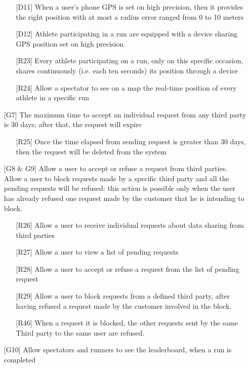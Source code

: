 \begin{itemize}
\begin{itemize}
	\item[{[D11]}] When a user's phone GPS is set on high precision, then it provides the right position with at most a radius error ranged from 0 to 10 meters
	\item[{[D12]}] Athlete participating in a run are equipped with a device sharing GPS position set on high precision
	\item[{[R23]}] Every athlete participating on a run, only on this specific occasion, shares continuously (i.e. each ten seconds) its position through a device
	\item[{[R24]}] Allow a spectator to see on a map the real-time position of every athlete in a specific run
	\end{itemize}
\item[{[G7]}] The maximum time to accept an individual request from any third party is 30 days; after that, the request will expire
	\begin{itemize}
	\item[{[R25]}] Once the time elapsed from sending request is greater than 30 days, then the request will be deleted from the system
	\end{itemize}
\item[{[G8 \& G9]}] Allow a user to accept or refuse a request from third parties. Allow a user to block requests made by a specific third party and all the pending requests will be refused: this action is possible only when the user has already refused one request made
by the customer that he is intending to block. 
	\begin{itemize}
	\item[{[R26]}] Allow a user to receive individual requests about data sharing from third parties
	\item[{[R27]}] Allow a user to view a list of pending requests
	\item[{[R28]}] Allow a user to accept or refuse a request from the list of pending request
	\item[{[R29]}] Allow a user to block requests from a defined third party, after having refused a request made by the customer
	involved in the block.
	\item[{[R46]}] When a request it is blocked, the other requests sent by the same Third party to the same user are refused.
	\end{itemize}	
\item[{[G10]}] Allow spectators and runners to see the leaderboard, when a run is completed
	\begin{itemize}

\end{itemize}
\end{itemize}
